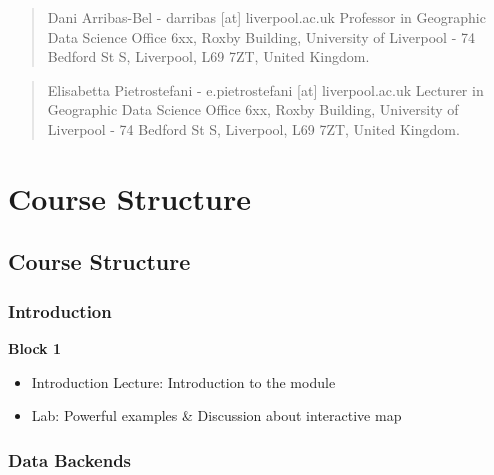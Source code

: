 \documentclass[
  letterpaper,
  DIV=11,
  numbers=noendperiod]{scrreprt}
\begin{document}

\begin{quote}
Dani Arribas-Bel - darribas {[}at{]} liverpool.ac.uk Professor in
Geographic Data Science Office 6xx, Roxby Building, University of
Liverpool - 74 Bedford St S, Liverpool, L69 7ZT, United Kingdom.
\end{quote}

\begin{quote}
Elisabetta Pietrostefani - e.pietrostefani {[}at{]} liverpool.ac.uk
Lecturer in Geographic Data Science Office 6xx, Roxby Building,
University of Liverpool - 74 Bedford St S, Liverpool, L69 7ZT, United
Kingdom.
\end{quote}


\hypertarget{course-structure}{%
\chapter*{Course Structure}\label{course-structure}}


\hypertarget{course-structure-1}{%
\section*{Course Structure}\label{course-structure-1}}


\hypertarget{introduction}{%
\subsection*{Introduction}\label{introduction}}

\textbf{Block 1}

\begin{itemize}
\item
  Introduction Lecture: Introduction to the module
\item
  Lab: Powerful examples \& Discussion about interactive map
\end{itemize}

\hypertarget{data-backends}{%
\subsection*{Data Backends}\label{data-backends}}
\end{document}

